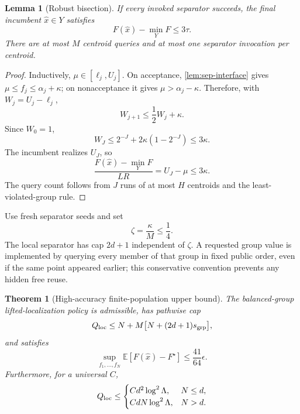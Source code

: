\documentclass[11pt]{article}
\numberwithin{equation}{section}
\newtheorem{theorem}{Theorem}[section]
\newtheorem{lemma}[lemma]{Lemma}
\theoremstyle{remark}
\theoremstyle{definition}
\newcommand{\E}{\mathbb{E}}
\newcommand{\eps}{\epsilon}
\begin{document}
\begin{lemma}[Robust bisection]
\label{lem:robust-bisection}
If every invoked separator succeeds, the final incumbent $\widehat x\in Y$ satisfies
\[
F(\widehat x)-\min_YF\le3\tau.
\]
There are at most $M$ centroid queries and at most one separator invocation per centroid.
\end{lemma}

\begin{proof}
Inductively, $\mu\in[\ell_j,U_j]$.  On acceptance, \cref{lem:sep-interface} gives $\mu\le f_j\le\alpha_j+\kappa$; on nonacceptance it gives $\mu>\alpha_j-\kappa$.  Therefore, with $W_j=U_j-\ell_j$,
\[
W_{j+1}\le\frac12W_j+\kappa.
\]
Since $W_0=1$,
\[
W_J\le2^{-J}+2\kappa(1-2^{-J})\le3\kappa.
\]
The incumbent realizes $U_J$, so
\[
\frac{F(\widehat x)-\min_YF}{LR}=U_J-\mu\le3\kappa.
\]
The query count follows from $J$ runs of at most $H$ centroids and the least-violated-group rule.
\end{proof}

Use fresh separator seeds and set
\[
\zeta=\frac\kappa M\le\frac14.
\]
The local separator has cap $2d+1$ independent of $\zeta$.  A requested group value is implemented by querying every member of that group in fixed public order, even if the same point appeared earlier; this conservative convention prevents any hidden free reuse.

\begin{theorem}[High-accuracy finite-population upper bound]
\label{thm:localization-upper}
The balanced-group lifted-localization policy is admissible, has pathwise cap
\begin{equation}
Q_{\rm loc}
\le
N+M\bigl[N+(2d+1)s_{\rm grp}\bigr],
\label{eq:Qloc}
\end{equation}
and satisfies
\begin{equation}
\sup_{f_1,\ldots,f_N}
\E[F(\widehat x)-F^\star]
\le\frac{41}{64}\eps.
\label{eq:localization-risk}
\end{equation}
Furthermore, for a universal $C$,
\begin{equation}
Q_{\rm loc}
\le
\begin{cases}
C d^2\log^2\Lambda,&N\le d,\\
C dN\log^2\Lambda,&N>d.
\end{cases}
\label{eq:localization-asymptotic}
\end{equation}
\end{theorem}
\end{document}
